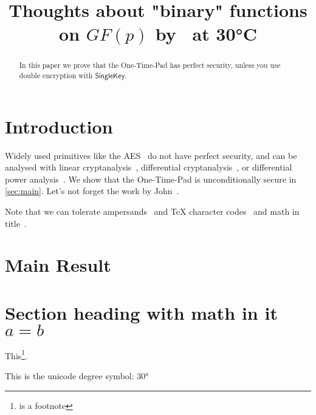 \documentclass[version=final]{iacrcc}
\title[plaintext={Thoughts on binary functions}]{Thoughts about "binary" functions on $GF(p)$ by \niceguy\ at 30°C}
\begin{document}
\maketitle

\begin{abstract}
  In this paper we prove that the One-Time-Pad has perfect security, unless you use
  double encryption with {$\mathsf{SingleKey}$}.

  \lipsum[8]
\end{abstract}


\section{Introduction}

Widely used primitives like the AES~\cite{AES} do not have perfect
security, and can be analysed with linear
cryptanalysis~\cite{EC:Matsui93}, differential
cryptanalysis~\cite{JC:BihSha91}, or differential power
analysis~\cite{C:KocJafJun99}.  We show that the One-Time-Pad is
unconditionally secure in \autoref{sec:main}. Let's not forget
the work by John~\cite{vonNeumann}.

Note that we can tolerate ampersands~\cite{Dalheimer02} and \TeX
character codes~\cite{Bohme10} and math in
title~\cite{ACISP:MurPla19,ACISP:LYLF19,ACISP:WeiSteSha03,CCS:BHKNRS19,ACNS:DurHugVau20}.

\lipsum[9]

\section{Main Result}\label{sec:main}

\lipsum

\section{Section heading with math in it $a=b$}
\lipsum

This\footnote{is a footnote}.

This is the unicode degree symbol: 30°

\end{document}
